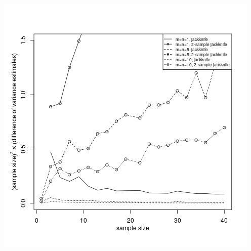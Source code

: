 \documentclass{beamer}
\begin{document}
\begin{frame}
  \centering
  \includegraphics[scale=.5]{fig1.png}
\end{frame}

\end{document}
